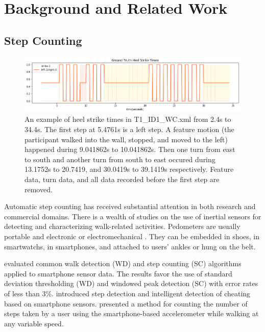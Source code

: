 \documentclass[11pt]{article}
\begin{document}
{\section{Background and Related Work}

\subsection{Step Counting}

\begin{figure}[ht]
\centering
\includegraphics[scale=0.5]{ground_truth_2}
\caption{An example of heel strike times in T1\_ID1\_WC.xml from 2.4s to 34.4s. The first step at 5.4761s is a left step. A feature motion (the participant walked into the wall, stopped, and moved to the left) happened during 9.041862s to 10.041862s. Then one turn from east to south and another turn from south to east occured during 13.1752s to 20.7419, and 30.0419s to 39.1419s respectively. Feature data, turn data, and all data recorded before the first step are removed.}
\label{fig:ground_truth}
\end{figure}


Automatic step counting has received substantial attention in both research and commercial domains. There is a wealth of studies on the use of inertial sensors for detecting and characterizing walk-related activities. Pedometers are usually portable and electronic or electromechanical \cite{wiki:pedometer}. They can be embedded in shoes, in smartwatchs, in  smartphones, and attached to users' ankles or hung on the belt.

\cite{brajdic2013walk} evaluated common walk detection (WD) and step counting (SC) algorithms applied to smartphone sensor data. The results favor the use of standard deviation thresholding (WD) and windowed peak detection (SC) with error rates of less than 3\%.
\cite{tomlein2012advanced} introduced step detection and intelligent detection of cheating based on smartphone sensors.
\cite{naqvib2012step} presented a method for counting the number of steps taken by a user using the smartphone-based accelerometer while walking at any variable speed.

}
\end{document}
